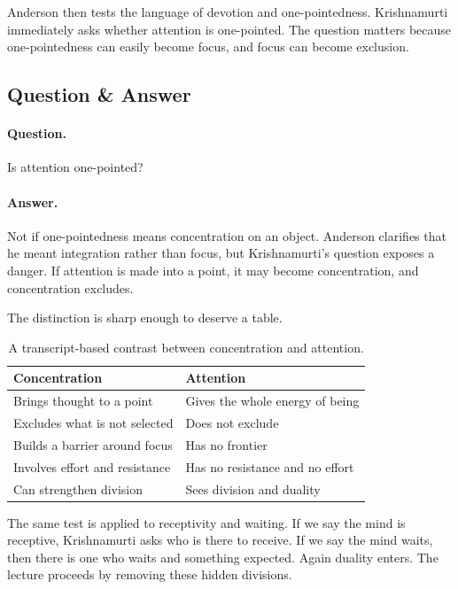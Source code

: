 Anderson then tests the language of devotion and one-pointedness. Krishnamurti immediately asks whether attention is one-pointed. The question matters because one-pointedness can easily become focus, and focus can become exclusion.

\subsection{Question \& Answer}

\paragraph{Question.}
Is attention one-pointed?

\paragraph{Answer.}
Not if one-pointedness means concentration on an object. Anderson clarifies that he meant integration rather than focus, but Krishnamurti's question exposes a danger. If attention is made into a point, it may become concentration, and concentration excludes.

The distinction is sharp enough to deserve a table.

\begin{table}
\centering
\begin{tabular}{|p{.42\linewidth}|p{.42\linewidth}|}
\hline
\textbf{Concentration} & \textbf{Attention} \\
\hline
Brings thought to a point & Gives the whole energy of being \\
\hline
Excludes what is not selected & Does not exclude \\
\hline
Builds a barrier around focus & Has no frontier \\
\hline
Involves effort and resistance & Has no resistance and no effort \\
\hline
Can strengthen division & Sees division and duality \\
\hline
\end{tabular}
\caption{A transcript-based contrast between concentration and attention.}
\end{table}

The same test is applied to receptivity and waiting. If we say the mind is receptive, Krishnamurti asks who is there to receive. If we say the mind waits, then there is one who waits and something expected. Again duality enters. The lecture proceeds by removing these hidden divisions.

